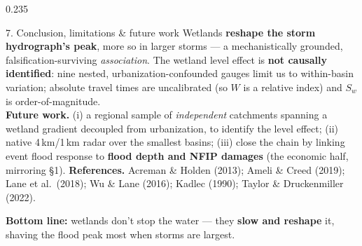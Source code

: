 \documentclass[final]{beamer}
\newcommand{\hl}[1]{\colorbox{robustbg}{\parbox{0.95\linewidth}{\color{dukenavy}#1}}}
\begin{document}
\begin{frame}[t]
\begin{columns}[t]
\begin{column}{0.235\paperwidth}
\begin{block}{7. Conclusion, limitations \& future work}
Wetlands \textbf{reshape the storm hydrograph's peak}, more so in larger storms --- a mechanistically
grounded, falsification-surviving \emph{association}. The wetland level effect is \textbf{not causally
identified}: nine nested, urbanization-confounded gauges limit us to within-basin variation; absolute
travel times are uncalibrated (so $W$ is a relative index) and $S_w$ is order-of-magnitude.
\smallskip\\
\textbf{Future work.} (i) a regional sample of \emph{independent} catchments spanning a wetland gradient
decoupled from urbanization, to identify the level effect; (ii) native 4\,km/1\,km radar over the
smallest basins; (iii) close the chain by linking event flood response to \textbf{flood depth and NFIP
damages} (the economic half, mirroring \S1).
\vskip5pt
{\textbf{References.} Acreman \& Holden (2013); Ameli \& Creed (2019); Lane et al.\ (2018);
Wu \& Lane (2016); Kadlec (1990); Taylor \& Druckenmiller (2022).}
\vskip6pt
\hl{\centering\textbf{Bottom line:} wetlands don't stop the water --- they \textbf{slow and reshape}
it, shaving the flood peak most when storms are largest.}
\end{block}
\end{column}

\end{columns}
\end{frame}
\end{document}
